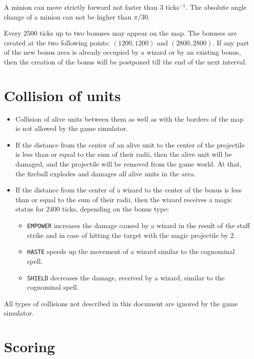 A minion can move strictly forward not faster than $3$ ticks$^{-1}$. The absolute angle change of a minion can not be higher than $\pi / 30$.
 
Every $2500$ ticks up to two bonuses may appear on the map. The bonuses are created at the two following points: $(1200, 1200)$ and
$(2800, 2800)$. If any part of the new bonus area is already occupied by a wizard or by an existing bonus, then the creation of the bonus
will be postponed till the end of the next interval.
 
\section{Collision of units}

\begin{itemize}
 \item Collision of alive units between them as well as with the borders of the map is not allowed by the game simulator.
 \item If the distance from the center of an alive unit to the center of the projectile is less than or equal to the sum of their radii, then the alive unit will be damaged, and the projectile
            will be removed from the game world. At that, the fireball explodes and damages all alive units in the area.
 \item If the distance from the center of a wizard to the center of the bonus is less than or equal to the sum of their radii, then the wizard receives a magic status
            for $2400$ ticks, depending on the bonus type:
            \begin{itemize}
            \item \texttt{EMPOWER} increases the damage caused by a wizard in the result of the staff strike and in case of hitting the target
                    with the magic projectile by $2$.
            \item \texttt{HASTE} speeds up the movement of a wizard similar to the cognominal spell.
            \item \texttt{SHIELD} decreases the damage, received by a wizard, similar to the cognominal spell.
            \end{itemize}
\end{itemize}
 
All types of collisions not described in this document are ignored by the game simulator.
 
\section{Scoring}
 
